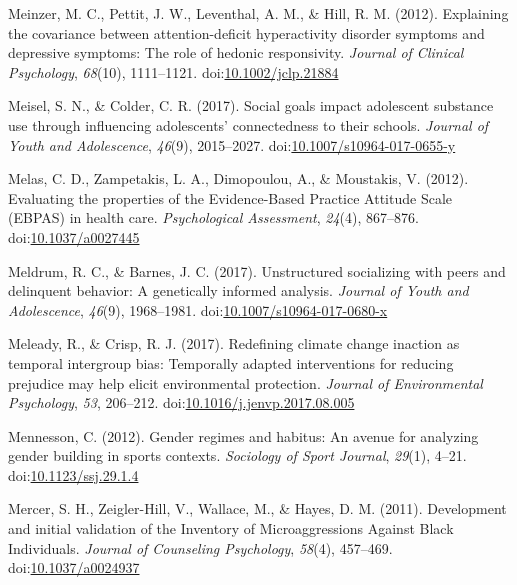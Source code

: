 \documentclass[english,man]{apa6}
\begin{document}
\hypertarget{ref-Meinzer2012}{}
Meinzer, M. C., Pettit, J. W., Leventhal, A. M., \& Hill, R. M. (2012).
Explaining the covariance between attention-deficit hyperactivity
disorder symptoms and depressive symptoms: The role of hedonic
responsivity. \emph{Journal of Clinical Psychology}, \emph{68}(10),
1111--1121.
doi:\href{https://doi.org/10.1002/jclp.21884}{10.1002/jclp.21884}

\hypertarget{ref-Meisel2017}{}
Meisel, S. N., \& Colder, C. R. (2017). Social goals impact adolescent
substance use through influencing adolescents' connectedness to their
schools. \emph{Journal of Youth and Adolescence}, \emph{46}(9),
2015--2027.
doi:\href{https://doi.org/10.1007/s10964-017-0655-y}{10.1007/s10964-017-0655-y}

\hypertarget{ref-Melas2012}{}
Melas, C. D., Zampetakis, L. A., Dimopoulou, A., \& Moustakis, V.
(2012). Evaluating the properties of the Evidence-Based Practice
Attitude Scale (EBPAS) in health care. \emph{Psychological Assessment},
\emph{24}(4), 867--876.
doi:\href{https://doi.org/10.1037/a0027445}{10.1037/a0027445}

\hypertarget{ref-Meldrum2017}{}
Meldrum, R. C., \& Barnes, J. C. (2017). Unstructured socializing with
peers and delinquent behavior: A genetically informed analysis.
\emph{Journal of Youth and Adolescence}, \emph{46}(9), 1968--1981.
doi:\href{https://doi.org/10.1007/s10964-017-0680-x}{10.1007/s10964-017-0680-x}

\hypertarget{ref-Meleady2017}{}
Meleady, R., \& Crisp, R. J. (2017). Redefining climate change inaction
as temporal intergroup bias: Temporally adapted interventions for
reducing prejudice may help elicit environmental protection.
\emph{Journal of Environmental Psychology}, \emph{53}, 206--212.
doi:\href{https://doi.org/10.1016/j.jenvp.2017.08.005}{10.1016/j.jenvp.2017.08.005}

\hypertarget{ref-Mennesson2012}{}
Mennesson, C. (2012). Gender regimes and habitus: An avenue for
analyzing gender building in sports contexts. \emph{Sociology of Sport
Journal}, \emph{29}(1), 4--21.
doi:\href{https://doi.org/10.1123/ssj.29.1.4}{10.1123/ssj.29.1.4}

\hypertarget{ref-Mercer2011}{}
Mercer, S. H., Zeigler-Hill, V., Wallace, M., \& Hayes, D. M. (2011).
Development and initial validation of the Inventory of Microaggressions
Against Black Individuals. \emph{Journal of Counseling Psychology},
\emph{58}(4), 457--469.
doi:\href{https://doi.org/10.1037/a0024937}{10.1037/a0024937}
\end{document}
